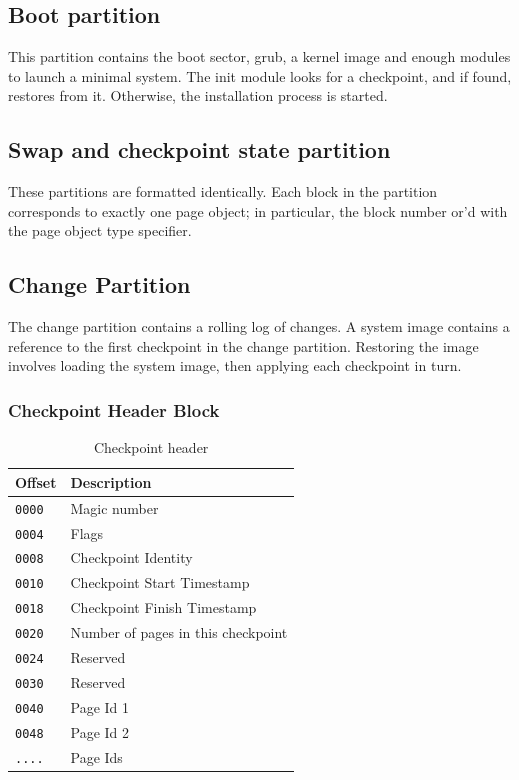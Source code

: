\subsection{Boot partition}

This partition contains the boot sector, grub, a kernel image and enough modules to launch a minimal system.  The init module looks for a checkpoint, and if found, restores from it.  Otherwise, the installation process is started.

\subsection{Swap and checkpoint state partition}

These partitions are formatted identically.  Each block in the partition corresponds to exactly one page object; in particular,  the block number or'd with the page object type specifier.

\subsection{Change Partition}

The change partition contains a rolling log of changes.  A system image contains a reference to the first checkpoint in the change partition.  Restoring the image involves loading the system image, then applying each checkpoint in turn.

\subsubsection{Checkpoint Header Block}

\begin{table}[ht]
\begin{tabular}{l l}
\hline\hline
Offset &  Description \\
\hline
{\tt 0000} & Magic number \\
{\tt 0004} & Flags \\
{\tt 0008} & Checkpoint Identity \\
{\tt 0010} & Checkpoint Start Timestamp \\
{\tt 0018} & Checkpoint Finish Timestamp \\
{\tt 0020} & Number of pages in this checkpoint \\
{\tt 0024} & Reserved \\
{\tt 0030} & Reserved \\
{\tt 0040} & Page Id 1 \\
{\tt 0048} & Page Id 2 \\
{\tt ....} & Page Ids \\
\hline
\end{tabular}
\caption{Checkpoint header}
\label{table:change-partition-header}
\end{table}

